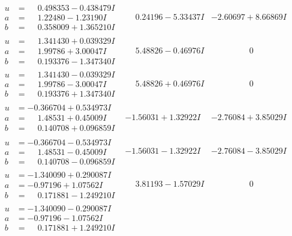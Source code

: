 \documentclass[1p]{elsarticle_modified}
\theoremstyle{definition}
\begin{document}
$$\begin{array}{c|c|c}
\begin{aligned}
u &= \phantom{-}0.498353 - 0.438479 I \\
a &= \phantom{-}1.22480 - 1.23190 I \\
b &= \phantom{-}0.358009 + 1.365210 I\end{aligned}
 & \phantom{-}0.24196 - 5.33437 I & -2.60697 + 8.66869 I \\ \hline\begin{aligned}
u &= \phantom{-}1.341430 + 0.039329 I \\
a &= \phantom{-}1.99786 + 3.00047 I \\
b &= \phantom{-}0.193376 - 1.347340 I\end{aligned}
 & \phantom{-}5.48826 - 0.46976 I & \phantom{-0.000000 } 0 \\ \hline\begin{aligned}
u &= \phantom{-}1.341430 - 0.039329 I \\
a &= \phantom{-}1.99786 - 3.00047 I \\
b &= \phantom{-}0.193376 + 1.347340 I\end{aligned}
 & \phantom{-}5.48826 + 0.46976 I & \phantom{-0.000000 } 0 \\ \hline\begin{aligned}
u &= -0.366704 + 0.534973 I \\
a &= \phantom{-}1.48531 + 0.45009 I \\
b &= \phantom{-}0.140708 + 0.096859 I\end{aligned}
 & -1.56031 + 1.32922 I & -2.76084 + 3.85029 I \\ \hline\begin{aligned}
u &= -0.366704 - 0.534973 I \\
a &= \phantom{-}1.48531 - 0.45009 I \\
b &= \phantom{-}0.140708 - 0.096859 I\end{aligned}
 & -1.56031 - 1.32922 I & -2.76084 - 3.85029 I \\ \hline\begin{aligned}
u &= -1.340090 + 0.290087 I \\
a &= -0.97196 + 1.07562 I \\
b &= \phantom{-}0.171881 - 1.249210 I\end{aligned}
 & \phantom{-}3.81193 - 1.57029 I & \phantom{-0.000000 } 0 \\ \hline\begin{aligned}
u &= -1.340090 - 0.290087 I \\
a &= -0.97196 - 1.07562 I \\
b &= \phantom{-}0.171881 + 1.249210 I\end{aligned}

\end{array}$$
\end{document}

